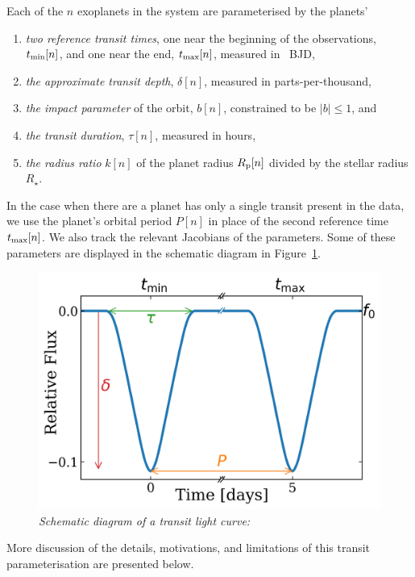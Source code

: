 \documentclass[linenumbers,floatfix,ApJL,twocolumn]{aastex631}
\begin{document}
Each of the $n$ exoplanets in the system are parameterised by the planets'
\begin{enumerate}
  \item \emph{two reference transit times}, one near the beginning of the observations, $t_{\rm min}[n]$, and one near the end, $t_{\rm max}[n]$, measured in \tess\ BJD,
  \item \emph{the approximate transit depth}, $\delta[n]$, measured in parts-per-thousand,
  \item \emph{the impact parameter} of the orbit, $b[n]$, constrained to be $|b| \le 1$, and
  \item \emph{the transit duration}, $\tau[n]$, measured in hours,
  \item \emph{the radius ratio} $k[n]$ of the planet radius $R_{\rm p}[n]$ divided by the stellar radius $R_\star$.
\end{enumerate}
In the case when there are a planet has only a single transit present in the data, we use the planet's orbital period $P[n]$ in place of the second reference time $t_{\rm max}[n]$.
We also track the relevant Jacobians of the parameters. Some of these parameters are displayed in the schematic diagram in Figure~\ref{fig:schematic-transit-plot}.


\begin{figure}
  \includegraphics[width=\linewidth]{figures/transit_model.png}
  \caption{\textit{Schematic diagram of a transit light curve:} }
  \label{fig:schematic-transit-plot}
\end{figure}

More discussion of the details, motivations, and limitations of this transit parameterisation are presented below.
\end{document}
